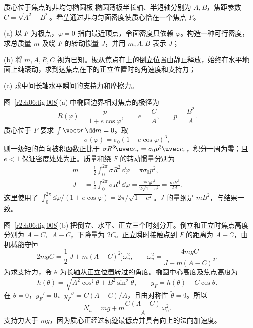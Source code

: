 \begin{practicebox}{质心位于焦点的非均匀椭圆板}
椭圆薄板半长轴、半短轴分别为 $A,B$，焦距参数 $C=\sqrt{A^2-B^2}$。希望通过非均匀面密度使质心恰在一个焦点 $F$。

(a) 以 $F$ 为极点，$\varphi=0$ 指向最近顶点，令面密度只依赖 $\varphi$。构造一种可行密度，求总质量 $m$ 及绕 $F$ 的转动惯量 $J$，并用 $m,A,B$ 表示 $J$；

(b) 将 $m,A,B,C$ 视为已知。板从焦点在上的倒立位置由静止释放，始终在水平地面上纯滚动，求到达焦点在下的正立位置时的角速度和支持力；

(c) 求中间长轴水平瞬间的支持力和摩擦力。
\label{r2ch06:pr:006}
\begin{solution}
图~\ref{r2ch06:fig:008}(a) 中椭圆边界相对焦点的极径为
\[
 R(\varphi)=\frac{p}{1+e\cos\varphi},\qquad
 e=\frac CA,\qquad p=\frac{B^2}{A}.
\]
质心位于 $F$ 要求 $\int\vect r\,\dd m=0$。取
\begin{equation}
 \boxed{\sigma(\varphi)=\sigma_0(1+e\cos\varphi)^3},
 \label{r2ch06:eq:037}
\end{equation}
则一级矩的角向被积函数正比于
$\sigma R^3\uvec e_r=\sigma_0p^3\uvec e_r$，积分一周为零；且 $e<1$ 保证密度处处为正。质量和绕 $F$ 的转动惯量分别为
\begin{equation}
 \begin{aligned}
 m&=\frac12\int_0^{2\pi}\sigma R^2\,\dd\varphi
 =\pi\sigma_0p^2,\\
 J&=\frac14\int_0^{2\pi}\sigma R^4\,\dd\varphi
 =\frac{\pi\sigma_0p^4}{2\sqrt{1-e^2}}
 =\boxed{\frac{mB^3}{2A}}.
 \end{aligned}
 \label{r2ch06:eq:038}
\end{equation}
这里使用了 $\int_0^{2\pi}\dd\varphi/(1+e\cos\varphi)=2\pi/\sqrt{1-e^2}$。$J$ 的量纲是 $mB^2$，与结果一致。

图~\ref{r2ch06:fig:008}(b) 把倒立、水平、正立三个时刻分开。倒立和正立时焦点高度分别为 $A+C$、$A-C$，下降量为 $2C$。正立瞬时接触点到 $F$ 的距离为 $A-C$，由机械能守恒
\begin{equation}
 2mgC=\frac12\bigl[J+m(A-C)^2\bigr]\omega_u^2,\qquad
 \boxed{\omega_u^2=\frac{4mgC}{J+m(A-C)^2}}.
 \label{r2ch06:eq:039}
\end{equation}
为求支持力，令 $\theta$ 为长轴从正立位置转过的角度。椭圆中心高度及焦点高度为
\[
 h(\theta)=\sqrt{A^2\cos^2\theta+B^2\sin^2\theta},\qquad
 y_F=h(\theta)-C\cos\theta.
\]
在 $\theta=0$，$y_F'=0$、$y_F''=C(A-C)/A$，且由对称性 $\ddot\theta=0$。所以
\begin{equation}
 \boxed{N_u=mg+m\frac{C(A-C)}A\,\omega_u^2}.
 \label{r2ch06:eq:040}
\end{equation}
支持力大于 $mg$，因为质心正经过轨迹最低点并具有向上的法向加速度。


\end{solution}
\end{practicebox}
